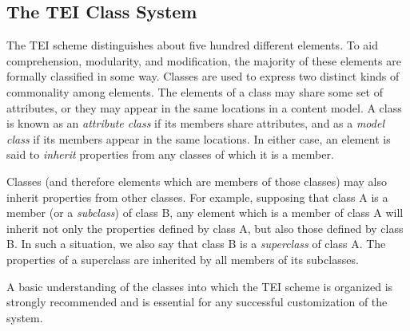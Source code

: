 \subsection[{The TEI Class System}]{The TEI Class System}\label{STEC}\par
The TEI scheme distinguishes about five hundred different elements. To aid comprehension, modularity, and modification, the majority of these elements are formally classified in some way. Classes are used to express two distinct kinds of commonality among elements. The elements of a class may share some set of attributes, or they may appear in the same locations in a content model. A class is known as an \textit{attribute class} if its members share attributes, and as a \textit{model class} if its members appear in the same locations. In either case, an element is said to \textit{inherit} properties from any classes of which it is a member.\par
Classes (and therefore elements which are members of those classes) may also inherit properties from other classes. For example, supposing that class A is a member (or a \textit{subclass}) of class B, any element which is a member of class A will inherit not only the properties defined by class A, but also those defined by class B. In such a situation, we also say that class B is a \textit{superclass} of class A. The properties of a superclass are inherited by all members of its subclasses.\par
A basic understanding of the classes into which the TEI scheme is organized is strongly recommended and is essential for any successful customization of the system.
